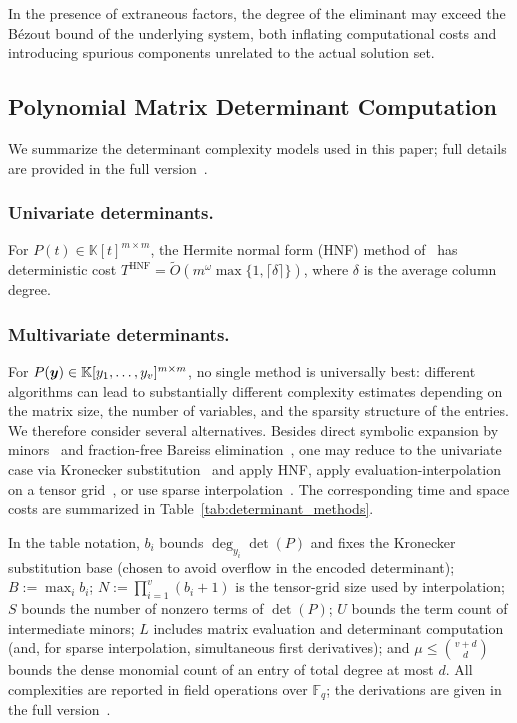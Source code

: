 In the presence of extraneous factors, the degree of the eliminant may exceed the B\'ezout bound of the underlying system, both inflating computational costs and introducing spurious components unrelated to the actual solution set.

\subsection{Polynomial Matrix Determinant Computation}\label{subsection:poly_mat_det}
We summarize the determinant complexity models used in this paper; full details are provided in the full version~\cite{cryptoeprint:2026/1969}.

\subsubsection{Univariate determinants.}
For $P(t)\in\mathbb{K}[t]^{m\times m}$, the Hermite normal form (HNF) method of~\cite{DBLP:journals/jc/LabahnNZ17} has deterministic cost $T^{\mathrm{HNF}}=\widetilde{O}(m^{\omega}\max\{1,\lceil\delta\rceil\})$, where $\delta$ is the average column degree.

\subsubsection{Multivariate determinants.}
For $P({\boldsymbol{y}})\in \mathbb{K}[y_1,\ldots,y_v]^{m\times m}$, no single method is universally best: different algorithms can lead to substantially different complexity estimates depending on the matrix size, the number of variables, and the sparsity structure of the entries. We therefore consider several alternatives. Besides direct symbolic expansion by minors~\cite{HorowitzSahni1975,GentlemanJohnson1976} and fraction-free Bareiss elimination~\cite{Bareiss1968}, one may reduce to the univariate case via Kronecker substitution~\cite{Li2007symbolic} and apply HNF, apply evaluation-interpolation on a tensor grid~\cite{HorowitzSahni1975}, or use sparse interpolation~\cite{DBLP:journals/jsc/Huang23}. The corresponding time and space costs are summarized in Table~\ref{tab:determinant_methods}.

In the table notation, $b_i$ bounds $\deg_{y_i}\det(P)$ and fixes the Kronecker substitution base (chosen to avoid overflow in the encoded determinant); $B:=\max_i b_i$; $N:=\prod_{i=1}^{v}(b_i+1)$ is the tensor-grid size used by interpolation; $S$ bounds the number of nonzero terms of $\det(P)$; $U$ bounds the term count of intermediate minors; $L$ includes matrix evaluation and determinant computation (and, for sparse interpolation, simultaneous first derivatives); and $\mu\le \binom{v+d}{d}$ bounds the dense monomial count of an entry of total degree at most $d$. All complexities are reported in field operations over $\mathbb{F}_q$; the derivations are given in the full version~\cite{cryptoeprint:2026/1969}.

